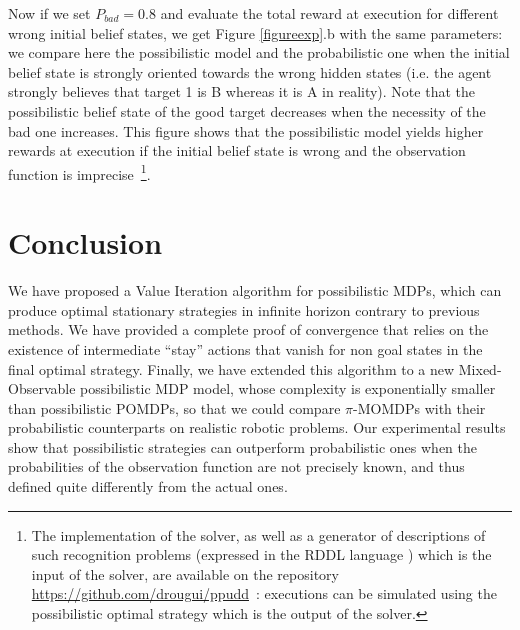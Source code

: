 Now if we set $P_{bad}=0.8$ 
and evaluate the total reward 
at execution for different 
wrong initial belief states, 
we get Figure \ref{figureexp}.b 
with the same parameters: 
we compare here the possibilistic model 
and the probabilistic one 
when the initial belief state 
is strongly oriented 
towards the wrong hidden states 
(i.e. the agent strongly 
believes that target 1 is B 
whereas it is A in reality). 
Note that the possibilistic belief state 
of the good target 
decreases when the necessity of the
bad one increases. 
This figure shows that the possibilistic model 
yields higher rewards at execution 
if the initial belief state is wrong 
and the observation function is imprecise~\footnote{
The implementation of the solver,
as well as a generator of descriptions of such recognition problems
(expressed in the RDDL language \cite{Sanner_relationaldynamic}) 
which is the input of the solver,
are available on the repository \url{https://github.com/drougui/ppudd}~:
executions can be simulated using the possibilistic optimal strategy
which is the output of the solver.}.

\section{Conclusion}
We have proposed a Value Iteration algorithm for possibilistic MDPs, which
can produce optimal stationary strategies in infinite horizon contrary to previous
methods. We have provided a complete proof of convergence that relies on the
existence of intermediate ``stay'' actions that vanish 
for non goal states in the final optimal strategy. 
Finally, we have extended this algorithm to a new Mixed-Observable
possibilistic MDP model, whose complexity is exponentially smaller than
possibilistic POMDPs, so that we could compare $\pi$-MOMDPs with their
probabilistic counterparts on realistic robotic problems. Our experimental
results show that possibilistic strategies can outperform probabilistic 
ones when the probabilities of the observation function are not precisely known,
and thus defined quite differently from the actual ones.


